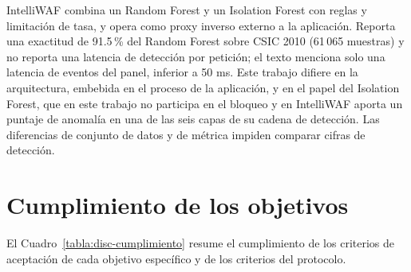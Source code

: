IntelliWAF \parencite{shinde2026intelliwaf} combina un Random Forest y un Isolation Forest con reglas y limitación de tasa, y opera como proxy inverso externo a la aplicación. Reporta una exactitud de 91.5\,\% del Random Forest sobre CSIC 2010 (61\,065 muestras) y no reporta una latencia de detección por petición; el texto menciona solo una latencia de eventos del panel, inferior a 50 ms. Este trabajo difiere en la arquitectura, embebida en el proceso de la aplicación, y en el papel del Isolation Forest, que en este trabajo no participa en el bloqueo y en IntelliWAF aporta un puntaje de anomalía en una de las seis capas de su cadena de detección. Las diferencias de conjunto de datos y de métrica impiden comparar cifras de detección.

\section{Cumplimiento de los objetivos}

El Cuadro~\ref{tabla:disc-cumplimiento} resume el cumplimiento de los criterios de aceptación de cada objetivo específico y de los criterios del protocolo.

